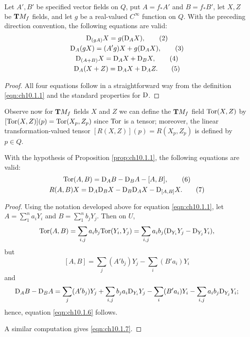 \documentclass[../main]{subfiles}
\begin{document}
\begin{proposition} \label{prop:ch10.1.1}
Let $A',B'$ be specified vector fields on $Q$, put $A=f_*A'$ and $B=f_*B'$, let $X,Z$ be $\mathbf{T}M_f$ fields, and let $g$ be a real-valued $C^\infty$ function on $Q$. With the preceding direction convention, the following equations are valid:
    \begin{gather}
    \mathrm{D}_{(gA)} X = g(\mathrm{D}_A X),
    \label{eqn:ch10.1.2}\tag{2} \\
    \mathrm{D}_A(gX) = (A'g)X + g(\mathrm{D}_A X),
    \label{eqn:ch10.1.3}\tag{3} \\
    \mathrm{D}_{(A+B)} X = \mathrm{D}_A X + \mathrm{D}_B X,
    \label{eqn:ch10.1.4}\tag{4}\\
    \mathrm{D}_A(X+Z) = \mathrm{D}_A X + \mathrm{D}_A Z.\tag{5}
    \label{eqn:ch10.1.5}
    \end{gather}
\end{proposition}

\begin{proof}
All four equations follow in a straightforward way from the definition \eqref{eqn:ch10.1.1} and the standard properties for $\mathrm{D}$.
\end{proof}

Observe now for $\mathbf{T}M_f$ fields $X$ and $Z$ we can define the $\mathbf{T}M_f$ field $\mathrm{Tor}(X,Z)$ by $[\mathrm{Tor}(X,Z)](p)=\mathrm{Tor}(X_p,Z_p)$ since $\mathrm{Tor}$ is a tensor; moreover, the linear transformation-valued tensor $[R(X,Z)](p)=R(X_p,Z_p)$ is defined by $p\in Q$.



\begin{proposition} \label{prop:ch10.1.2}
With the hypothesis of Proposition \eqref{prop:ch10.1.1}, the following equations are valid:
    \begin{gather}
    \mathrm{Tor}(A,B) = \mathrm{D}_A B - \mathrm{D}_B A - [A,B],
    \label{eqn:ch10.1.6}\tag{6} \\
    R(A,B)X = \mathrm{D}_A \mathrm{D}_B X - \mathrm{D}_B \mathrm{D}_A X - \mathrm{D}_{[A,B]}X.
    \label{eqn:ch10.1.7}\tag{7}
    \end{gather}
\end{proposition}

\begin{proof}
Using the notation developed above for equation \eqref{eqn:ch10.1.1}, let $A=\displaystyle\sum_1^n a_iY_i$ and $B=\displaystyle\sum_1^n b_jY_j$. Then on $U$,
\[
\mathrm{Tor}(A,B)
=
\sum_{i,j} a_ib_j \mathrm{Tor}(Y_i,Y_j)
=
\sum_{i,j} a_ib_j (\mathrm{D}_{Y_i} Y_j - \mathrm{D}_{Y_j} Y_i),
\]
but
\[
[A,B]
=
\sum_j (A' b_j) Y_j - \sum_i (B' a_i) Y_i
\]
and
\[
\mathrm{D}_A B - \mathrm{D}_B A
=
\sum_j (A' b_j) Y_j
    + \sum_{i,j} b_j a_i \mathrm{D}_{Y_i} Y_j
    - \sum_i (B' a_i) Y_i
    - \sum_{i,j} a_i b_j \mathrm{D}_{Y_j} Y_i;
\]
hence, equation \eqref{eqn:ch10.1.6} follows.

A similar computation gives \eqref{eqn:ch10.1.7}.
\end{proof}
\end{document}
